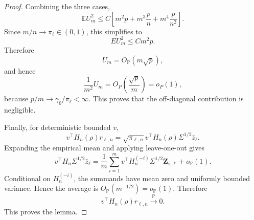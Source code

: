 \documentclass{article}
\theoremstyle{plain}
\theoremstyle{remark}
\def \bZ{\mathbf{Z}}
\def \E{\mathbb{E}}
\def \P{\mathbb{P}}
\def \bZ {{\boldsymbol{Z}}}
\begin{document}
\begin{proof}
Combining the three cases,
\[
\E U_m^2
\le
C\left[
m^2p
+
m^3\frac{p}{n}
+
m^4\frac{p}{n^2}
\right].
\]
Since \(m/n\to \pi_\ell\in(0,1)\), this simplifies to
\[
E U_m^2\le C m^2p.
\]
Therefore
\[
U_m=O_{\P}(m\sqrt p),
\]
and hence
\[
\frac{1}{m^2}U_m
=
O_P\left(\frac{\sqrt p}{m}\right)
=o_P(1),
\]
because \(p/m\to \gamma_0/\pi_\ell<\infty\).  This proves that the off-diagonal contribution is
negligible.



Finally, for deterministic bounded \(v\),
\[
v^\top H_n(\rho)r_{\ell,n}
=
\sqrt{\pi_{\ell,n}}
v^\top H_n(\rho)\Sigma^{1/2}\bar z_\ell.
\]
Expanding the empirical mean and applying leave-one-out gives
\[
v^\top H_n\Sigma^{1/2}\bar z_\ell
=
\frac1m\sum_{i=1}^m
v^\top H_n^{(-i)}\Sigma^{1/2}\bZ_{i,\ell}
+
o_{\P}(1).
\]
Conditional on \(H_n^{(-i)}\), the summands have mean zero and uniformly bounded variance. Hence the average is \(O_{\P}(m^{-1/2})=o_{\P}(1)\). Therefore
\[
v^\top H_n(\rho)r_{\ell,n}\stackrel{\P}{\to} 0.
\]
This proves the lemma.
\end{proof}
\end{document}
